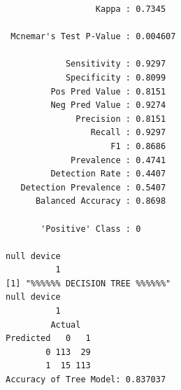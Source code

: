 \documentclass{article}
\begin{document}
\begin{thebibliography}{9}
\begin{verbatim}
                  Kappa : 0.7345          
                                          
 Mcnemar's Test P-Value : 0.004607        
                                          
            Sensitivity : 0.9297          
            Specificity : 0.8099          
         Pos Pred Value : 0.8151          
         Neg Pred Value : 0.9274          
              Precision : 0.8151          
                 Recall : 0.9297          
                     F1 : 0.8686          
             Prevalence : 0.4741          
         Detection Rate : 0.4407          
   Detection Prevalence : 0.5407          
      Balanced Accuracy : 0.8698          
                                          
       'Positive' Class : 0               
                                          
null device                                                                                                                     
          1 
[1] "%%%%%% DECISION TREE %%%%%%"
null device 
          1 
         Actual
Predicted   0   1
        0 113  29
        1  15 113
Accuracy of Tree Model: 0.837037 
  \end{verbatim}

\end{thebibliography}
\end{document}
